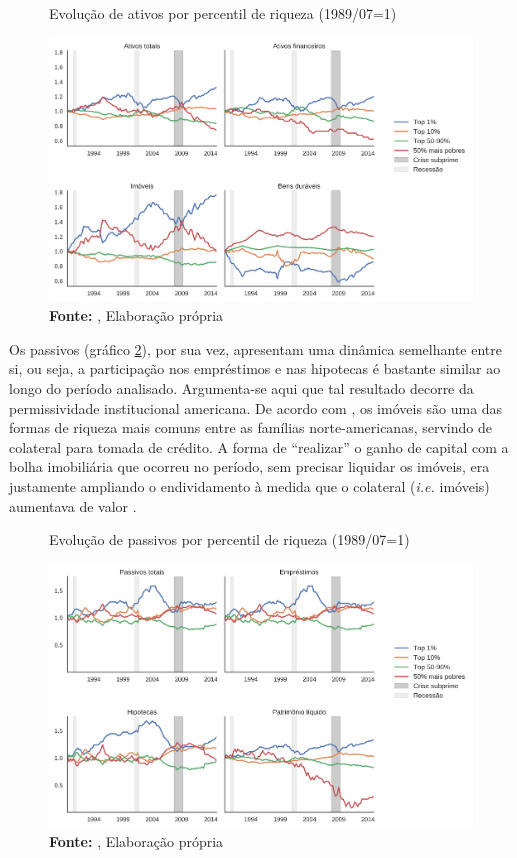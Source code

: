 \begin{figure}[H]
	\centering
	\caption{Evolução de ativos por percentil de riqueza (1989/07=1)}
	\label{FigDistAtivos}
	\includegraphics[width=\textwidth]{../../Dados/Fatos_Estilizados/figs/Distribuicao_Ativos.png}
	\caption*{\textbf{Fonte:} \textcite{us_census_bureau_characteristics_2017}, Elaboração própria}
\end{figure}

Os passivos (gráfico \ref{FigDistPassivos}), por sua vez, apresentam uma dinâmica semelhante entre si, ou seja, a participação nos empréstimos e nas hipotecas  é bastante similar ao longo do período analisado.
Argumenta-se aqui que tal resultado decorre da permissividade institucional americana.
De acordo com \textcite{teixeira_uma_2011}, os imóveis são uma das formas de riqueza mais comuns entre as famílias norte-americanas, servindo de colateral para tomada de crédito. A forma de ``realizar'' o ganho de capital com a bolha imobiliária que ocorreu no período, sem precisar liquidar os imóveis, era justamente ampliando o endividamento à medida que o colateral (\textit{i.e.} imóveis) aumentava de valor \cite{teixeira_crescimento_2015}. 


\begin{figure}[H]
	\centering
	\caption{Evolução de passivos por percentil de riqueza (1989/07=1)}
	\label{FigDistPassivos}
	\includegraphics[width=\textwidth]{../../Dados/Fatos_Estilizados/figs/Distribuicao_Passivos.png}
	\caption*{\textbf{Fonte:} \textcite{us_census_bureau_characteristics_2017}, Elaboração própria}
\end{figure}


